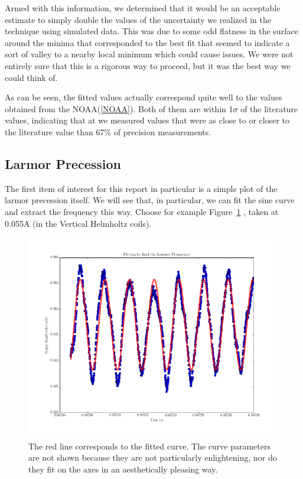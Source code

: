 \documentclass{article}
\begin{document}
    \hspace{.25cm}

    Armed with this information, we determined that it would be an acceptable estimate to simply double the values of the uncertainty we realized in the technique using simulated data.  This was due to some odd flatness in the surface around the minima that corresponded to the best fit that seemed to indicate a sort of valley to a nearby local minimum which could cause issues.  We were not entirely sure that this is a rigorous way to proceed, but it was the best way we could think of.

    \hspace{.25cm}

    As can be seen, the fitted values actually correspond quite well to the values obtained from the NOAA(\ref{NOAA}).  Both of them are within 1$\sigma$ of the literature values, indicating that at we measured values that were as close to or closer to the literature value than 67\% of precision measurements.

  \subsection{Larmor Precession}
    The first item of interest for this report in particular is a simple plot of the larmor precession itself.  We will see that, in particular, we can fit the sine curve and extract the frequency this way.  Choose for example Figure~\ref{sinwave} , taken at 0.055A (in the Vertical Helmholtz coils).

    \hspace{.25cm}

    \begin{figure}[!htb]
      \centering
      \includegraphics[scale=.45]{../plots/(larmor_y0_055A).png}
      \caption{The red line corresponds to the fitted curve.  The curve parameters are not shown because they are not particularly enlightening, nor do they fit on the axes in an aesthetically pleasing way.}
      \label{sinwave}
    \end{figure}
\end{document}

